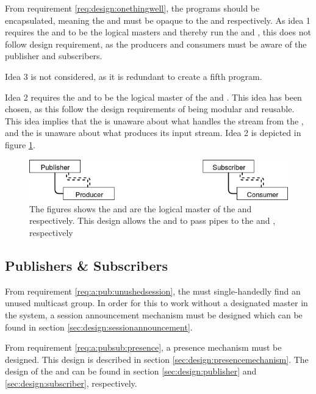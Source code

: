 From requirement \ref{req:design:onethingwell}, the programs should be encapsulated, meaning the \pubs{} and \subs{} must be opaque to the \cons{} and \pros{} respectively. As idea 1 requires the \cons{} and \pros{} to be the logical masters and thereby run the \pubs{} and \subs{}, this does not follow design requirement, as the producers and consumers must be aware of the publisher and subscribers.

Idea 3 is not considered, as it is redundant to create a fifth program.

Idea 2 requires the \pubs{} and \subs{} to be the logical master of the \cons{} and \pros{}. This idea has been chosen, as this follow the design requirements of being modular and reusable. This idea implies that the \pro{} is unaware about what handles the stream from the \pro{}, and the \con{} is unaware about what produces its input stream. Idea 2 is depicted in figure \ref{fig:design:pubsub:runmode_master}.

\begin{figure}[H]
	\centering
	\includegraphics[width=1\textwidth]{figures/runmode_master}
	\caption{The figures shows the \pub{} and \sub{} are the logical master of the \pro{} and \con{} respectively. This design allows the \pubs{} and \subs{} to pass pipes to the \pro{} and \con{}, respectively} \label{fig:design:pubsub:runmode_master}
\end{figure}

\subsection{Publishers \& Subscribers}
From requirement \ref{req:a:pub:unushedsession}, the \pub{} must single-handedly find an unused multicast group. In order for this to work without a designated master in the system, a session announcement mechanism must be designed which can be found in section \ref{sec:design:sessionannouncement}.


\noindent From requirement \ref{req:a:pubsub:presence}, a presence mechanism must be designed. This design is described in section \ref{sec:design:presencemechanism}. The design of the \pubs{} and \subs{} can be found in section \ref{sec:design:publisher} and \ref{sec:design:subscriber}, respectively.

